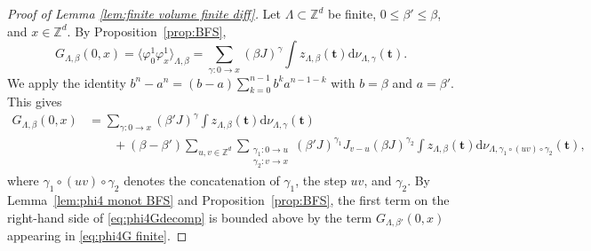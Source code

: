 \documentclass[11pt,a4paper]{article}
\numberwithin{equation}{section}
\theoremstyle{plain}
\theoremstyle{definition}
\newcommand\1{\mathds{1}}
\begin{document}
\begin{proof}[Proof of Lemma \textup{\ref{lem:finite volume finite diff}}]
Let $\Lambda\subset \mathbb Z^d$ be finite, $0\leq \beta'\leq \beta$, and $x\in \mathbb Z^d$. By Proposition~\ref{prop:BFS},
\begin{equation}\label{eq:pfdphi4 1}
	G_{\Lambda,\beta}(0,x)=\langle \varphi_0^1\varphi_x^1\rangle_{\Lambda,\beta}
    = \sum_{\gamma: 0 \rightarrow x} (\beta J )^{\gamma}
    \int z_{\Lambda,\beta}(\mathbf{t}) \mathrm{d}\nu_{\Lambda,\gamma}(\mathbf{t}).
\end{equation}
We apply the identity $b^{n}-a^{n} =(b-a) \sum_{k = 0}^{n-1}b^{k}a^{n-1-k}$
with $b=\beta$ and $a=\beta'$.
This gives
\begin{align}
\label{eq:phi4Gdecomp}
    G_{\Lambda,\beta}(0,x)
    & =
    \sum_{\gamma: 0 \rightarrow x} (\beta' J )^{\gamma}
    \int z_{\Lambda,\beta}(\mathbf{t}) \mathrm{d}\nu_{\Lambda,\gamma}(\mathbf{t})
    \\ \nonumber  & \qquad +
    (\beta-\beta')
    \sum_{u,v\in \mathbb Z^d}\sum_{\substack{\gamma_1:0\rightarrow u\\\gamma_2:v\rightarrow x}} (\beta' J)^{\gamma_1}  J_{v-u} (\beta J)^{\gamma_2}\int z_{\Lambda,\beta}(\mathbf{t}) \mathrm{d}\nu_{\Lambda,\gamma_1\circ (uv)\circ \gamma_2}(\mathbf{t}),
\end{align}
where $\gamma_1\circ (uv)\circ\gamma_2$ denotes the concatenation of $\gamma_1$, the step $uv$, and $\gamma_2$. By Lemma~\ref{lem:phi4 monot BFS} and Proposition~\ref{prop:BFS},
 the first term on the right-hand side of \eqref{eq:phi4Gdecomp}
is bounded above by the term $G_{\Lambda,\beta'}(0,x)$
appearing in \eqref{eq:phi4G finite}.



\end{proof}
\end{document}

